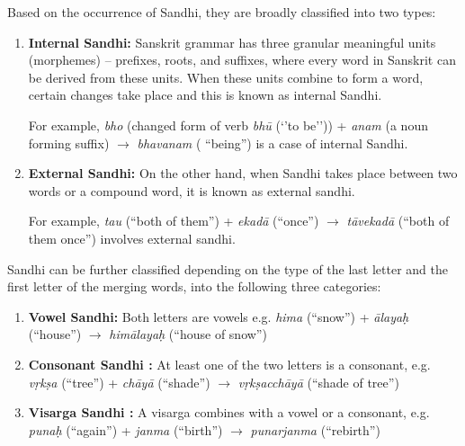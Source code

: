 \documentclass[11pt]{article}
\begin{document}
Based on the occurrence of Sandhi, they are broadly classified into two types:
\begin{enumerate}
	\item \textbf{Internal Sandhi:} Sanskrit grammar has three granular meaningful units (morphemes) – prefixes, roots, and suffixes, where every word in Sanskrit can be derived from these units. When these units combine to form a word, certain changes take place and this is known as internal Sandhi.
	
	For example, \textit{ bho} (changed form of verb \textit{bh\={u}} (‘’to be’’)) + \textit{anam} (a noun forming suffix) $\rightarrow$ \textit{bhavanam }( ``being'') is a case of internal Sandhi.
	
	\item \textbf{External Sandhi:}
	On the other hand, when Sandhi takes place between two words or a compound word, it is known as external sandhi. 
	
	For example,
	\textit{tau} (``both of them'') + \textit{ekad\={a}} (``once'') $\rightarrow$ \textit{t\={a}vekad\={a}} (``both of them once'') involves external sandhi.
	
\end{enumerate}

Sandhi can be further classified depending on the type of the last letter and the first letter of the merging words, into the following three categories:

\begin{enumerate}
	\item \textbf{Vowel Sandhi:} Both letters are vowels e.g. \textit{ hima} (``snow'') + \textit{ \={a}laya\d{h}} (``house'') $\rightarrow$ \textit{him\={a}laya\d{h}} (``house of snow'')
	\item \textbf{Consonant Sandhi :}  At least one of the two letters is a consonant, e.g. \textit{v\d{r}k\d{s}a} (``tree'') + \textit{ch\={a}y\={a} }(``shade'') $\rightarrow$ \textit{v\d{r}k\d{s}acch\={a}y\={a}} (``shade of tree'') 
	\item \textbf{Visarga Sandhi :} A visarga combines with a vowel or a consonant, e.g.  \textit{ puna\d{h} }(``again'') + \textit{janma }(``birth'') $\rightarrow$ \textit{punarjanma} (``rebirth'')
	
\end{enumerate}
\end{document}
